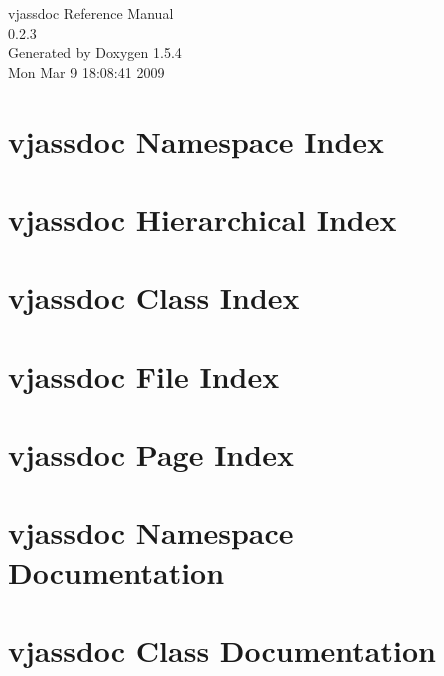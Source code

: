 \documentclass[a4paper]{book}
\begin{document}
\begin{titlepage}
\vspace*{7cm}
\begin{center}
{\Large vjassdoc Reference Manual\\[1ex]\large 0.2.3 }\\
\vspace*{1cm}
{\large Generated by Doxygen 1.5.4}\\
\vspace*{0.5cm}
{\small Mon Mar 9 18:08:41 2009}\\
\end{center}
\end{titlepage}
\clearemptydoublepage
{}
\tableofcontents
\clearemptydoublepage
{}
\chapter{vjassdoc Namespace Index}

\chapter{vjassdoc Hierarchical Index}

\chapter{vjassdoc Class Index}

\chapter{vjassdoc File Index}

\chapter{vjassdoc Page Index}

\chapter{vjassdoc Namespace Documentation}

\chapter{vjassdoc Class Documentation}


























\end{document}

